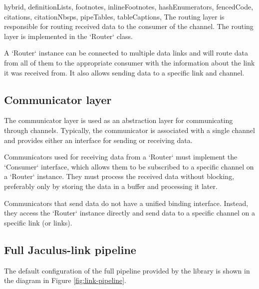 \begin{markdown*}{%
  hybrid,
  definitionLists,
  footnotes,
  inlineFootnotes,
  hashEnumerators,
  fencedCode,
  citations,
  citationNbsps,
  pipeTables,
  tableCaptions,
}
The routing layer is responsible for routing received data to the consumer of the channel. The routing layer is implemented in the `Router` class.

A `Router` instance can be connected to multiple data links and will route data from all of them to the appropriate consumer with the information about the link it was received from. It also allows sending data to a specific link and channel.

\subsection{Communicator layer}

The communicator layer is used as an abstraction layer for communicating through channels. Typically, the communicator is associated with a single channel and provides either an interface for sending or receiving data.

Communicators used for receiving data from a `Router` must implement the `Consumer` interface, which allows them to be subscribed to a specific channel on a `Router` instance. They must process the received data without blocking, preferably only by storing the data in a buffer and processing it later.

Communicators that send data do not have a unified binding interface. Instead, they access the `Router` instance directly and send data to a specific channel on a specific link (or links).

\subsection{Full Jaculus-link pipeline}

The default configuration of the full pipeline provided by the library is shown in the diagram in Figure \ref{fig:link-pipeline}.


\end{markdown*}
